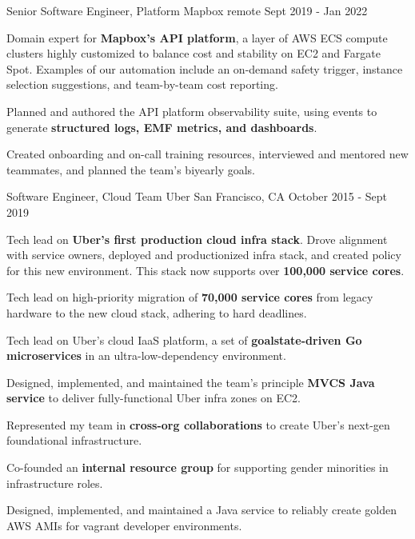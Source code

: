 
\begin{cventries}
  \cventry
    {Senior Software Engineer, Platform}
    {Mapbox}
    {remote}
    {Sept 2019 - Jan 2022}
    {
      \begin{cvitems} %
        \item {Domain expert for \textbf{Mapbox's API platform}, a layer of AWS ECS compute clusters highly customized to balance cost and stability on EC2 and Fargate Spot. Examples of our automation include an on-demand safety trigger, instance selection suggestions, and team-by-team cost reporting.}
        \item {Planned and authored the API platform observability suite, using events to generate \textbf{structured logs, EMF metrics, and dashboards}.}
        \item {Created onboarding and on-call training resources, interviewed and mentored new teammates, and planned the team's biyearly goals.}
      \end{cvitems}
    }

  \cventry
    {Software Engineer, Cloud Team} %
    {Uber} %
    {San Francisco, CA} %
    {October 2015 - Sept 2019} %
    {
      \begin{cvitems} %
        \item {Tech lead on \textbf{Uber's first production cloud infra stack}. Drove alignment with service owners, deployed and productionized infra stack, and created policy for this new environment.  This stack now supports over \textbf{100,000 service cores}.}
        \item {Tech lead on high-priority migration of \textbf{70,000 service cores} from legacy hardware to the new cloud stack, adhering to hard deadlines.}
        \item {Tech lead on Uber's cloud IaaS platform, a set of \textbf{goalstate-driven Go microservices} in an ultra-low-dependency environment.}
        \item {Designed, implemented, and maintained the team's principle \textbf{MVCS Java service} to deliver fully-functional Uber infra zones on EC2.}
        \item {Represented my team in \textbf{cross-org collaborations} to create Uber's next-gen foundational infrastructure.}
        \item {Co-founded an \textbf{internal resource group} for supporting gender minorities in infrastructure roles.}
        \item {Designed, implemented, and maintained a Java service to reliably create golden AWS AMIs for vagrant developer environments.}
      \end{cvitems}
    }

\end{cventries}
